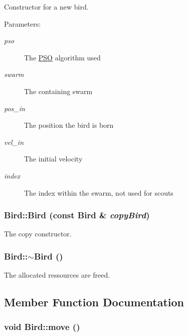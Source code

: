 Constructor for a new bird. 

\begin{Desc}
\item[Parameters: ]\par
\begin{description}
\item[{\em 
pso}]The \hyperlink{classPSO}{PSO} algorithm used \item[{\em 
swarm}]The containing swarm \item[{\em 
pos\_\-in}]The position the bird is born \item[{\em 
vel\_\-in}]The initial velocity \item[{\em 
index}]The index within the swarm, not used for scouts \end{description}
\end{Desc}
\hypertarget{classBird_39d3ca069eaa6c0f686f4c00d10952ff}{
\subsubsection{\setlength{\rightskip}{0pt plus 5cm}Bird::Bird (const {\bf Bird} \& {\em copyBird})}}
\label{classBird_39d3ca069eaa6c0f686f4c00d10952ff}


The copy constructor. 

\hypertarget{classBird_7d10693b91a2736611c37f1ef205b911}{
\subsubsection{\setlength{\rightskip}{0pt plus 5cm}Bird::$\sim$Bird ()}}
\label{classBird_7d10693b91a2736611c37f1ef205b911}


The allocated ressources are freed. 



\subsection{Member Function Documentation}
\hypertarget{classBird_927de56d5f04e630f71d5488e57ee7ac}{
\subsubsection{\setlength{\rightskip}{0pt plus 5cm}void Bird::move ()}}
\label{classBird_927de56d5f04e630f71d5488e57ee7ac}


